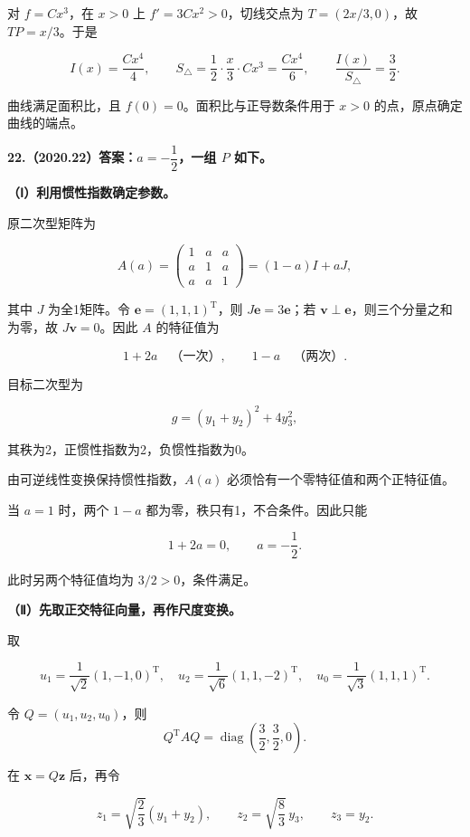 \documentclass[UTF8,11pt,fontset=windows]{ctexart}
\begin{document}
对 $f=Cx^3$，在 $x>0$ 上 $f'=3Cx^2>0$，切线交点为 $T=(2x/3,0)$，故 $TP=x/3$。于是

$$
I(x)=\frac{Cx^4}{4},
\qquad S_{\triangle}=\frac12\cdot\frac x3\cdot Cx^3=\frac{Cx^4}{6},
\qquad \frac{I(x)}{S_{\triangle}}=\frac32.
$$

曲线满足面积比，且 $f(0)=0$。面积比与正导数条件用于 $x>0$ 的点，原点确定曲线的端点。

\clearpage

\textbf{22.（2020.22）答案：$a=-\dfrac12$，一组 $P$ 如下。}

\textbf{（Ⅰ）利用惯性指数确定参数。}

原二次型矩阵为

$$
A(a)=\begin{pmatrix}1&a&a\\a&1&a\\a&a&1\end{pmatrix}
=(1-a)I+aJ,
$$

其中 $J$ 为全1矩阵。令 $\boldsymbol e=(1,1,1)^{\mathrm T}$，则 $J\boldsymbol e=3\boldsymbol e$；若 $\boldsymbol v\perp\boldsymbol e$，则三个分量之和为零，故 $J\boldsymbol v=0$。因此 $A$ 的特征值为

$$
1+2a\quad\text{（一次）},\qquad 1-a\quad\text{（两次）}.
$$

目标二次型为

$$
g=(y_1+y_2)^2+4y_3^2,
$$

其秩为2，正惯性指数为2，负惯性指数为0。

由可逆线性变换保持惯性指数，$A(a)$ 必须恰有一个零特征值和两个正特征值。

当 $a=1$ 时，两个 $1-a$ 都为零，秩只有1，不合条件。因此只能

$$
1+2a=0,\qquad a=-\frac12.
$$

此时另两个特征值均为 $3/2>0$，条件满足。

\textbf{（Ⅱ）先取正交特征向量，再作尺度变换。}

取

$$
u_1=\frac1{\sqrt2}(1,-1,0)^{\mathrm T},\quad
u_2=\frac1{\sqrt6}(1,1,-2)^{\mathrm T},\quad
u_0=\frac1{\sqrt3}(1,1,1)^{\mathrm T}.
$$

令 $Q=(u_1,u_2,u_0)$，则
$$
Q^{\mathrm T}AQ=\operatorname{diag}\left(\frac32,\frac32,0\right).
$$

在 $\boldsymbol x=Q\boldsymbol z$ 后，再令

$$
z_1=\sqrt{\frac23}(y_1+y_2),\qquad
z_2=\sqrt{\frac83}\,y_3,\qquad z_3=y_2.
$$
\end{document}
